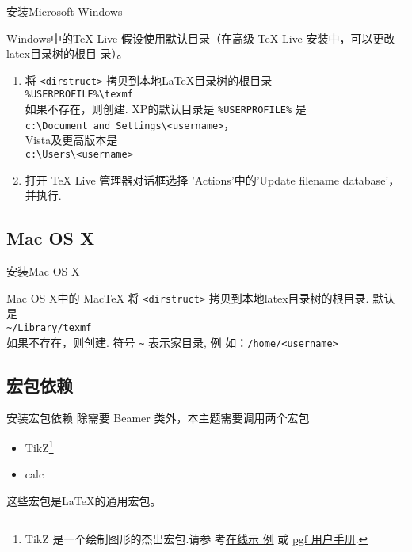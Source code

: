\documentclass[xcolor=svgnames, t, aspectratio=169]{ctexbeamer}
\begin{document}
\begin{frame}{安装}{Microsoft Windows}
  \begin{block}{Windows中的TeX Live}
    假设使用默认目录（在高级 TeX Live 安装中，可以更改latex目录树的根目
    录）。
    \begin{enumerate}
    \item 将 {\tt <dirstruct>} 拷贝到本地{\LaTeX}目录树的根目录\\
      {\tt \%USERPROFILE\%\textbackslash texmf}\\
      如果不存在，则创建. XP的默认目录是 {\tt \%USERPROFILE\%} 是\\
      {\tt c:\textbackslash Document and
        Settings\textbackslash<username>}，\\
      Vista及更高版本是\\
      {\tt c:\textbackslash Users\textbackslash<username>}
    \item 打开 TeX Live 管理器对话框选择 'Actions'中的'Update filename
      database'，并执行.
    \end{enumerate}
  \end{block}
\end{frame}

\subsection{Mac OS X}
\begin{frame}{安装}{Mac OS X}
  \begin{block}{Mac OS X中的 MacTeX}
    将 {\tt <dirstruct>} 拷贝到本地latex目录树的根目录. 默认是\\
    {\tt \textasciitilde /Library/texmf}\\
    如果不存在，则创建. 符号 {\tt \textasciitilde} 表示家目录, 例
    如：{\tt /home/<username>}
  \end{block}
\end{frame}

\subsection{宏包依赖}
\begin{frame}{安装}{宏包依赖}
  除需要 Beamer 类外，本主题需要调用两个宏包
  \begin{itemize}
  \item TikZ\footnote{TikZ 是一个绘制图形的杰出宏包.请参
      考\href{http://www.texample.net/tikz/examples/}{在线示
        例} 或
      \href{http://tug.ctan.org/tex-archive/graphics/pgf/base/doc/generic/pgf/pgfmanual.pdf}{pgf
        用户手册}. }
  \item calc
  \end{itemize}
  这些宏包是{\LaTeX}的通用宏包。
\end{frame}
\end{document}

